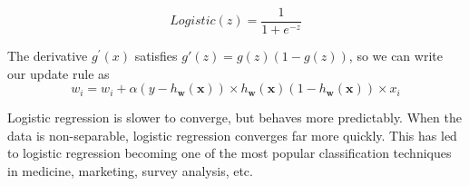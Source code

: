 \documentclass{article}
\begin{document}
\[
Logistic(z) = \frac{1}{1 + e^{-z}}
\]

The derivative $g^{\prime}(x)$ satisfies $g'(z) = g(z) (1 - g(z))$, so we can write
our update rule as 
\[
w_i = w_i + \alpha(y - h_{\textbf{w}}(\textbf{x})) \times h_{\textbf{w}}(\textbf{x})(1 - h_{\textbf{w}}(\textbf{x})) \times x_i
\]

Logistic regression is slower to converge, but behaves more predictably. When the data is
non-separable, logistic regression converges far more quickly. This has led to
logistic regression becoming one of the most popular classification techniques in
medicine, marketing, survey analysis, etc.
\end{document}
